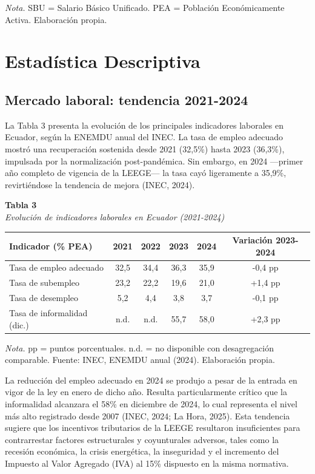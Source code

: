 \documentclass[12pt,spanish]{article}
\newcounter{none}
\begin{document}
\emph{Nota.} SBU = Salario Básico Unificado. PEA = Población
Económicamente Activa. Elaboración propia.

\section{Estadística Descriptiva}\label{estaduxedstica-descriptiva}

\subsection{Mercado laboral: tendencia
2021-2024}\label{mercado-laboral-tendencia-2021-2024}

La Tabla 3 presenta la evolución de los principales indicadores
laborales en Ecuador, según la ENEMDU anual del INEC. La tasa de empleo
adecuado mostró una recuperación sostenida desde 2021 (32,5\%) hasta
2023 (36,3\%), impulsada por la normalización post-pandémica. Sin
embargo, en 2024 ---primer año completo de vigencia de la LEEGE--- la
tasa cayó ligeramente a 35,9\%, revirtiéndose la tendencia de mejora
(INEC, 2024).

\textbf{Tabla 3}\\
\emph{Evolución de indicadores laborales en Ecuador (2021-2024)}

{\def\LTcaptype{none} %
\begin{longtable}[]{@{}lccccc@{}}
\toprule\noalign{}
Indicador (\% PEA) & 2021 & 2022 & 2023 & 2024 & Variación 2023-2024 \\
\midrule\noalign{}
\endhead
\bottomrule\noalign{}
\endlastfoot
Tasa de empleo adecuado & 32,5 & 34,4 & 36,3 & 35,9 & -0,4 pp \\
Tasa de subempleo & 23,2 & 22,2 & 19,6 & 21,0 & +1,4 pp \\
Tasa de desempleo & 5,2 & 4,4 & 3,8 & 3,7 & -0,1 pp \\
Tasa de informalidad (dic.) & n.d. & n.d. & 55,7 & 58,0 & +2,3 pp \\
\end{longtable}
}

\emph{Nota.} pp = puntos porcentuales. n.d. = no disponible con
desagregación comparable. Fuente: INEC, ENEMDU anual (2024). Elaboración
propia.

La reducción del empleo adecuado en 2024 se produjo a pesar de la
entrada en vigor de la ley en enero de dicho año. Resulta
particularmente crítico que la informalidad alcanzara el 58\% en
diciembre de 2024, lo cual representa el nivel más alto registrado desde
2007 (INEC, 2024; La Hora, 2025). Esta tendencia sugiere que los
incentivos tributarios de la LEEGE resultaron insuficientes para
contrarrestar factores estructurales y coyunturales adversos, tales como
la recesión económica, la crisis energética, la inseguridad y el
incremento del Impuesto al Valor Agregado (IVA) al 15\% dispuesto en la
misma normativa.
\end{document}
